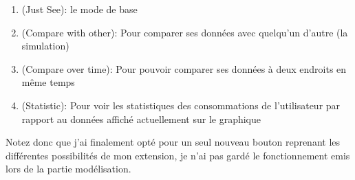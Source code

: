 \begin{enumerate}
    \item (Just See): le mode de base
    \item (Compare with other): Pour comparer ses données avec quelqu'un d'autre (la simulation)
    \item (Compare over time): Pour pouvoir comparer ses données à deux endroits en même temps
    \item (Statistic): Pour voir les statistiques des consommations de l'utilisateur par rapport au données affiché actuellement sur le graphique
\end{enumerate}

\begin{flushleft}
Notez donc que j'ai finalement opté pour un seul nouveau bouton reprenant les différentes possibilités de mon extension, je n'ai pas gardé le fonctionnement emis lors de la partie modélisation.
\end{flushleft}

